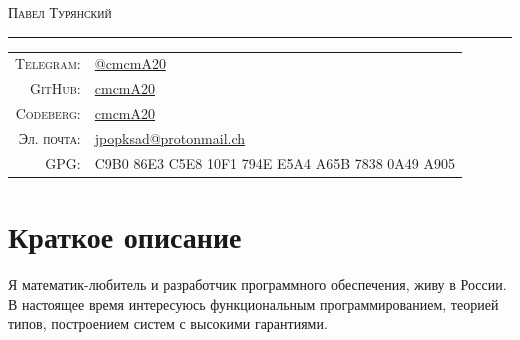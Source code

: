 \documentclass[a4paper,11pt]{article}
\begin{document}
  \begin{center}
    \Huge \textsc{Павел Турянский}
  \end{center}

  \hrule
  \vspace{0.5em}

  \begin{tabular}{rl}
    \textsc{Telegram:}  & \href{https://t.me/cmcmA20}{@cmcmA20}                         \\
    \textsc{GitHub:}    & \href{https://github.com/cmcmA20}{cmcmA20}                    \\
    \textsc{Codeberg:}  & \href{https://codeberg.org/cmcmA20}{cmcmA20}                  \\
    \textsc{Эл. почта:} & \href{mailto:jpopksad@protonmail.ch}{jpopksad@protonmail.ch}  \\
    \textsc{GPG:}       & C9B0 86E3 C5E8 10F1 794E  E5A4 A65B 7838 0A49 A905            \\
  \end{tabular}

  \section{Краткое описание}
    Я математик-любитель и разработчик программного обеспечения, живу в России. В настоящее время интересуюсь функциональным
    программированием, теорией типов, построением систем с высокими гарантиями.
\end{document}
